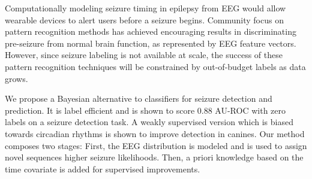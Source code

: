 
Computationally modeling seizure timing in epilepsy from EEG would allow wearable devices to alert users before a seizure begins. Community focus on pattern recognition methods has achieved encouraging results in discriminating pre-seizure from normal brain function, as represented by EEG feature vectors. However, since seizure labeling is not available at scale, the success of these pattern recognition techniques will be constrained by out-of-budget labels as data grows. 

We propose a Bayesian alternative to classifiers for seizure detection and prediction. It is label efficient and is shown to score 0.88 AU-ROC with zero labels on a seizure detection task. A weakly supervised version which is biased towards circadian rhythms is shown to improve detection in canines. Our method composes two stages: First, the EEG distribution is modeled and is used to assign novel sequences higher seizure likelihoods. Then, a priori knowledge based on the time covariate is added for supervised improvements.
